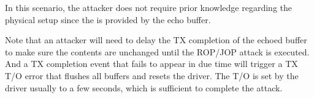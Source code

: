 
In this scenario, the attacker does not require prior knowledge regarding the physical setup since the \kva is provided by the echo buffer.  

Note that an attacker will need to delay the TX completion of the echoed buffer to make sure the contents are unchanged until the ROP/JOP attack is executed.
And a TX completion event that fails to appear in due time will trigger a TX T/O error that flushes all buffers and resets the driver. The T/O is set by the driver usually to a few seconds, which is sufficient to complete the attack.
 








